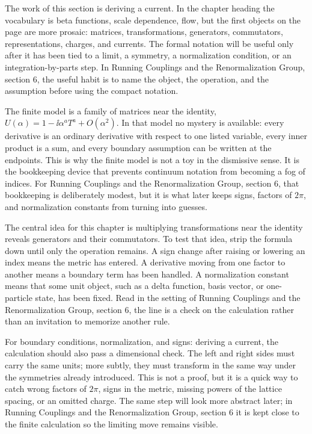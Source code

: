 The work of this section is deriving a current.  In the chapter heading the vocabulary is beta functions, scale dependence, flow, but the first objects on the page are more prosaic: matrices, transformations, generators, commutators, representations, charges, and currents.  The formal notation will be useful only after it has been tied to a limit, a symmetry, a normalization condition, or an integration-by-parts step.  In Running Couplings and the Renormalization Group, section 6, the useful habit is to name the object, the operation, and the assumption before using the compact notation.

The finite model is a family of matrices near the identity, \(U(\alpha)=1-\ii\alpha^aT^a+O(\alpha^2)\).  In that model no mystery is available: every derivative is an ordinary derivative with respect to one listed variable, every inner product is a sum, and every boundary assumption can be written at the endpoints.  This is why the finite model is not a toy in the dismissive sense.  It is the bookkeeping device that prevents continuum notation from becoming a fog of indices.  For Running Couplings and the Renormalization Group, section 6, that bookkeeping is deliberately modest, but it is what later keeps signs, factors of \(2\pi\), and normalization constants from turning into guesses.

The central idea for this chapter is multiplying transformations near the identity reveals generators and their commutators.  To test that idea, strip the formula down until only the operation remains.  A sign change after raising or lowering an index means the metric has entered.  A derivative moving from one factor to another means a boundary term has been handled.  A normalization constant means that some unit object, such as a delta function, basis vector, or one-particle state, has been fixed.  Read in the setting of Running Couplings and the Renormalization Group, section 6, the line is a check on the calculation rather than an invitation to memorize another rule.

For boundary conditions, normalization, and signs: deriving a current, the calculation should also pass a dimensional check.  The left and right sides must carry the same units; more subtly, they must transform in the same way under the symmetries already introduced.  This is not a proof, but it is a quick way to catch wrong factors of \(2\pi\), signs in the metric, missing powers of the lattice spacing, or an omitted charge.  The same step will look more abstract later; in Running Couplings and the Renormalization Group, section 6 it is kept close to the finite calculation so the limiting move remains visible.

